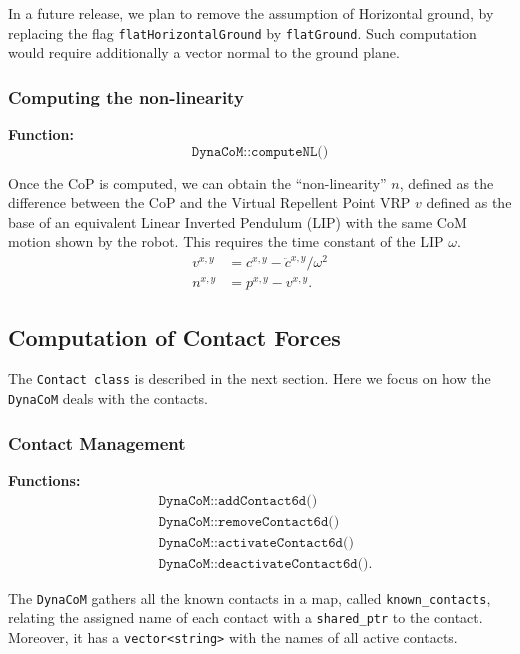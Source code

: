 \documentclass[12pt]{article}
\begin{document}
In a future release, we plan to remove the assumption of Horizontal ground, by replacing the flag \texttt{flatHorizontalGround} by \texttt{flatGround}. Such computation would require additionally a vector normal to the ground plane.

\subsubsection{Computing the non-linearity}

{\bf Function:}
\begin{equation*}
    \texttt{DynaCoM::computeNL()}
\end{equation*}

Once the CoP is computed, we can obtain the ``non-linearity'' $n$, defined as the difference between the CoP and the Virtual Repellent Point VRP $v$ defined as the base of an equivalent Linear Inverted Pendulum (LIP) with the same CoM motion shown by the robot. This requires the time constant of the LIP $ \omega $.
%
\begin{align}
    v^{x,y} &= c^{x,y} - \ddot{c}^{x,y}/\omega^2\\
    n^{x,y} &= p^{x,y} - v^{x,y}.
\end{align}

\clearpage
\newpage

\subsection{Computation of Contact Forces}
\hrulefill

The \texttt{Contact class} is described in the next section. Here we focus on how the \texttt{DynaCoM} deals with the contacts.

\subsubsection{Contact Management}

{\bf Functions:}
\begin{align*}
    &\texttt{DynaCoM::addContact6d()}\\
    &\texttt{DynaCoM::removeContact6d()}\\
    &\texttt{DynaCoM::activateContact6d()}\\
    &\texttt{DynaCoM::deactivateContact6d()}.
\end{align*}

The \texttt{DynaCoM} gathers all the known contacts in a map, called \texttt{known\_contacts}, relating the assigned name of each contact with a \texttt{shared\_ptr} to the contact. Moreover, it has a \texttt{vector<string>} with the names of all active contacts. 
\end{document}
